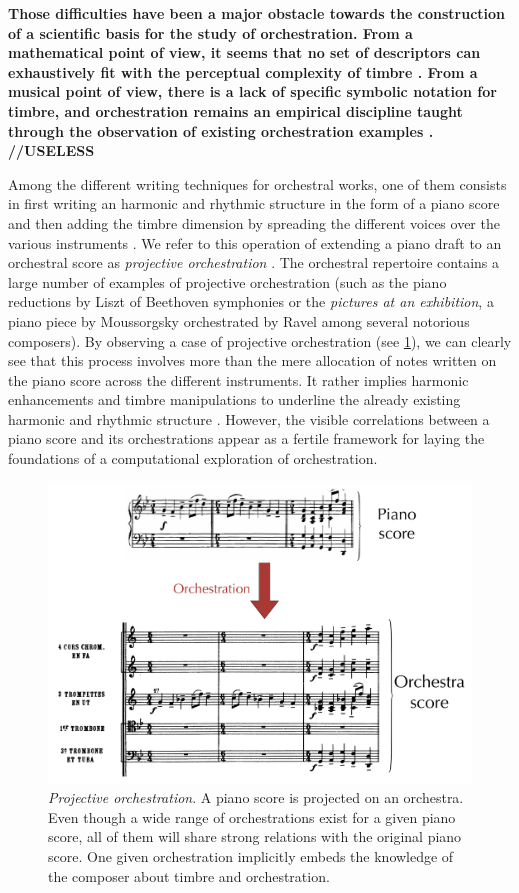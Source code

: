 \documentclass{article}
\begin{document}
\textbf{Those difficulties have been a major obstacle towards the construction of a scientific basis for the study of orchestration. From a mathematical point of view, it seems that no set of descriptors can exhaustively fit with the perceptual complexity of timbre \cite{peeters2011timbre}. From a musical point of view, there is a lack of specific symbolic notation for timbre, and orchestration remains an empirical discipline taught through the observation of existing orchestration examples \cite{piston-orch}. //USELESS}

Among the different writing techniques for orchestral works, one of them consists in first writing an harmonic and rhythmic structure in the form of a piano score and then adding the timbre dimension by spreading the different voices over the various instruments \cite{piston-orch}. We refer to this operation of extending a piano draft to an orchestral score as \textit{projective orchestration} \cite{eslingthesis}.
The orchestral repertoire contains a large number of examples of projective orchestration (such as the piano reductions by Liszt of Beethoven symphonies or the \textit{pictures at an exhibition}, a piano piece by Moussorgsky orchestrated by Ravel among several notorious composers). By observing a case of projective orchestration (see \ref{fig:orch}), we can clearly see that this process involves more than the mere allocation of notes written on the piano score across the different instruments. It rather implies harmonic enhancements and timbre manipulations to underline the already existing harmonic and rhythmic structure \cite{mcadams2013timbre}. However, the visible correlations between a piano score and its orchestrations appear as a fertile framework for laying the foundations of a computational exploration of orchestration.

\begin{figure}
\centering
\includegraphics[scale=0.15]{Data_representation/orch}
\caption{\textit{Projective orchestration}. A piano score is projected on an orchestra. Even though a wide range of orchestrations exist for a given piano score, all of them will share strong relations with the original piano score. One given orchestration implicitly embeds the knowledge of the composer about timbre and orchestration.}
\label{fig:orch}
\end{figure}
\end{document}
